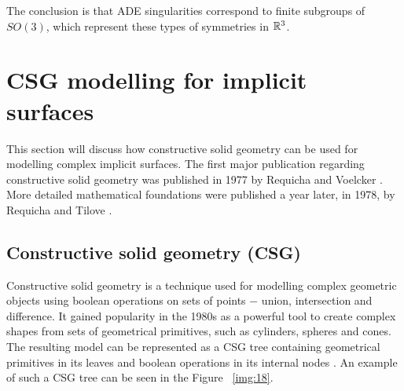 The conclusion is that ADE singularities correspond to finite subgroups of
$SO(3)$, which represent these types of symmetries in $\mathbb{R}^3$.

\section{CSG modelling for implicit surfaces}
\label{sub2.6}
This section will discuss how constructive solid geometry can be used for
modelling complex implicit surfaces. The first major publication regarding constructive
solid geometry was published in 1977 by Requicha and Voelcker \cite{requicha1977constructive}.
More detailed mathematical foundations were published a year later, in 1978, by
Requicha and Tilove \cite{requicha1978mathematical}.
\subsection{Constructive solid geometry (CSG)}
Constructive solid geometry is a technique used for modelling complex geometric
objects using boolean operations on sets of points $-$ union, intersection and
difference. It gained popularity in the 1980s as a powerful tool to create complex
shapes from sets of geometrical primitives, such as cylinders, spheres and cones.
The resulting model can be represented as a CSG tree containing geometrical
primitives in its leaves and boolean operations in its internal nodes 
\cite{foley1996computer}. An example of such a CSG tree can be seen in the Figure~
\ref{img:18}.

